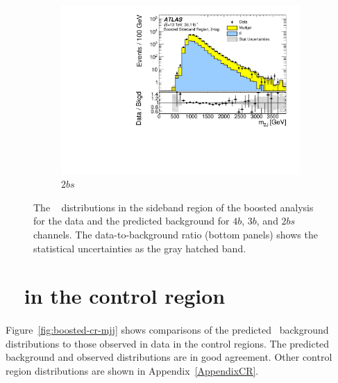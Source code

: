 \begin{figure}[htb!]
    \\
    \begin{subfigure}[b]{0.35\textwidth}
        \includegraphics[width=\textwidth,angle=-90]{figures/boosted/Paperplot/Moriond_bkg_9_TwoTag_split_Sideband_mHH_l_1.pdf}
        \caption{$2bs$}
        \label{fig:boosted-sb-mjj-2bs}
    \end{subfigure}
   \caption{The \mtwoJ~ distributions in the sideband region of the boosted analysis for the data and the predicted background for $4b$, $3b$, and $2bs$ channels. The data-to-background ratio (bottom panels) shows the statistical uncertainties as the gray hatched band.}
  \label{fig:boosted-sb-mjj}
\end{figure}


\clearpage
\section{\mtwoJ~ in the control region}
\label{sec:boosted-cr}

\paragraph{}
Figure~\ref{fig:boosted-cr-mjj} shows comparisons of the predicted \mtwoJ~background distributions to those observed in data in the control regions.
The predicted background and observed distributions are in good agreement.
Other control region distributions are shown in Appendix~\ref{AppendixCR}.

